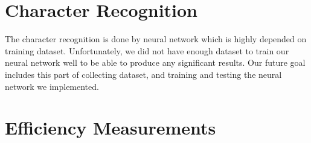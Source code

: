 \documentclass{standalone}
\begin{document}
\section{Character Recognition}
The character recognition is done by neural network which is highly depended on training dataset. Unfortunately, we did not have enough dataset to train our neural network well to be able to produce any significant results. Our future goal includes this part of collecting dataset, and training and testing the neural network we implemented.


\section{Efficiency Measurements}
\end{document}
